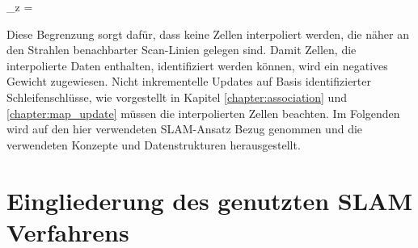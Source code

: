 \begin{myequation}
\Delta_z = 
\end{myequation}

Diese Begrenzung sorgt dafür, dass keine Zellen interpoliert werden, die näher an den Strahlen benachbarter Scan-Linien gelegen sind. Damit Zellen, die interpolierte Daten enthalten, identifiziert werden können, wird ein negatives Gewicht zugewiesen. Nicht inkrementelle Updates auf Basis identifizierter Schleifenschlüsse, wie vorgestellt in Kapitel \ref{chapter:association} und \ref{chapter:map_update} müssen die interpolierten Zellen beachten. Im Folgenden wird auf den hier verwendeten SLAM-Ansatz Bezug genommen und die verwendeten Konzepte und Datenstrukturen herausgestellt.

\section{Eingliederung des genutzten SLAM Verfahrens}
\label{section:slam}

